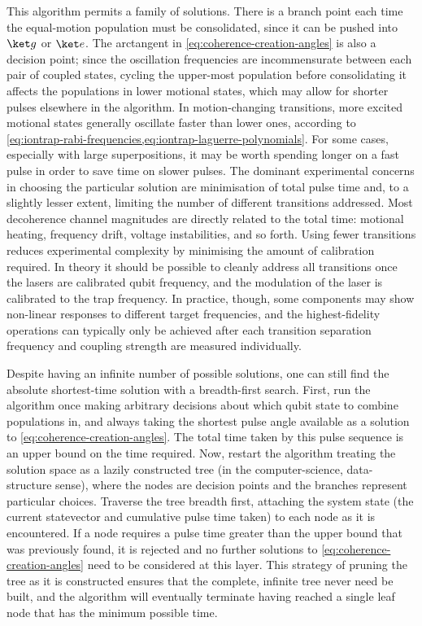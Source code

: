 This algorithm permits a family of solutions.
There is a branch point each time the equal-motion population must be consolidated, since it can be pushed into $\ket g$ or $\ket e$.
The arctangent in \cref{eq:coherence-creation-angles} is also a decision point; since the oscillation frequencies are incommensurate between each pair of coupled states, cycling the upper-most population before consolidating it affects the populations in lower motional states, which may allow for shorter pulses elsewhere in the algorithm.
In motion-changing transitions, more excited motional states generally oscillate faster than lower ones, according to \cref{eq:iontrap-rabi-frequencies,eq:iontrap-laguerre-polynomials}.
For some cases, especially with large superpositions, it may be worth spending longer on a fast pulse in order to save time on slower pulses.
The dominant experimental concerns in choosing the particular solution are minimisation of total pulse time and, to a slightly lesser extent, limiting the number of different transitions addressed.
Most decoherence channel magnitudes are directly related to the total time: motional heating, frequency drift, voltage instabilities, and so forth.
Using fewer transitions reduces experimental complexity by minimising the amount of calibration required.
In theory it should be possible to cleanly address all transitions once the lasers are calibrated qubit frequency, and the modulation of the laser is calibrated to the trap frequency.
In practice, though, some components may show non-linear responses to different target frequencies, and the highest-fidelity operations can typically only be achieved after each transition separation frequency and coupling strength are measured individually.

Despite having an infinite number of possible solutions, one can still find the absolute shortest-time solution with a breadth-first search.
First, run the algorithm once making arbitrary decisions about which qubit state to combine populations in, and always taking the shortest pulse angle available as a solution to \cref{eq:coherence-creation-angles}.
The total time taken by this pulse sequence is an upper bound on the time required.
Now, restart the algorithm treating the solution space as a lazily constructed tree (in the computer-science, data-structure sense), where the nodes are decision points and the branches represent particular choices.
Traverse the tree breadth first, attaching the system state (the current statevector and cumulative pulse time taken) to each node as it is encountered.
If a node requires a pulse time greater than the upper bound that was previously found, it is rejected and no further solutions to \cref{eq:coherence-creation-angles} need to be considered at this layer.
This strategy of pruning the tree as it is constructed ensures that the complete, infinite tree never need be built, and the algorithm will eventually terminate having reached a single leaf node that has the minimum possible time.

